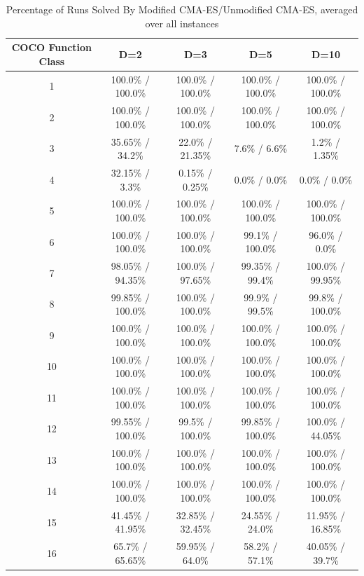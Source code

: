\documentclass[sigconf]{acmart}
\begin{document}
\begin{table}
	\centering
	\caption{Percentage of Runs Solved By Modified CMA-ES/Unmodified CMA-ES, averaged over all instances}
	\label{tab:experiment3Results}
	\begin{tabular}{c|c|c|c|c}
		\toprule
		COCO Function Class & D=2 & D=3 & D=5 & D=10\\
		\midrule
		1 &  100.0\% / 100.0\%  &  100.0\% / 100.0\%  &  100.0\% / 100.0\%  &  100.0\% / 100.0\% \\
		\hline
		2 &  100.0\% / 100.0\%  &  100.0\% / 100.0\%  &  100.0\% / 100.0\%  &  100.0\% / 100.0\% \\
		\hline				
		3 &  35.65\% / 34.2\%  &  22.0\% / 21.35\%  &  7.6\% / 6.6\%  &  1.2\% / 1.35\% \\
		\hline
		4 &  32.15\% / 3.3\%  &  0.15\% / 0.25\%  &  0.0\% / 0.0\%  &  0.0\% / 0.0\% \\
		\hline
		5 &  100.0\% / 100.0\%  &  100.0\% / 100.0\%  &  100.0\% / 100.0\%  &  100.0\% / 100.0\% \\
		\hline		
		6 &  100.0\% / 100.0\%  &  100.0\% / 100.0\%  &  99.1\% / 100.0\%  &  96.0\% / 0.0\% \\
		\hline
		7 &  98.05\% / 94.35\%  &  100.0\% / 97.65\%  &  99.35\% / 99.4\%  &  100.0\% / 99.95\% \\
		\hline
		8 &  99.85\% / 100.0\%  &  100.0\% / 100.0\%  &  99.9\% / 99.5\%  &  99.8\% / 100.0\% \\
		\hline				
		9 &  100.0\% / 100.0\%  &  100.0\% / 100.0\%  &  100.0\% / 100.0\%  &  100.0\% / 100.0\% \\
		\hline
		10 &  100.0\% / 100.0\%  &  100.0\% / 100.0\%  &  100.0\% / 100.0\%  &  100.0\% / 100.0\% \\
		\hline	
		11 &  100.0\% / 100.0\%  &  100.0\% / 100.0\%  &  100.0\% / 100.0\%  &  100.0\% / 100.0\% \\
		\hline					
		12 &  99.55\% / 100.0\%  &  99.5\% / 100.0\%  &  99.85\% / 100.0\%  &  100.0\% / 44.05\% \\
		\hline
		13 &  100.0\% / 100.0\%  &  100.0\% / 100.0\%  &  100.0\% / 100.0\%  &  100.0\% / 100.0\% \\
		\hline
		14 &  100.0\% / 100.0\%  &  100.0\% / 100.0\%  &  100.0\% / 100.0\%  &  100.0\% / 100.0\% \\
		\hline				
		15 &  41.45\% / 41.95\%  &  32.85\% / 32.45\%  &  24.55\% / 24.0\%  &  11.95\% / 16.85\% \\
		\hline
		16 &  65.7\% / 65.65\%  &  59.95\% / 64.0\%  &  58.2\% / 57.1\%  &  40.05\% / 39.7\% \\

\end{tabular}
\end{table}
\end{document}
